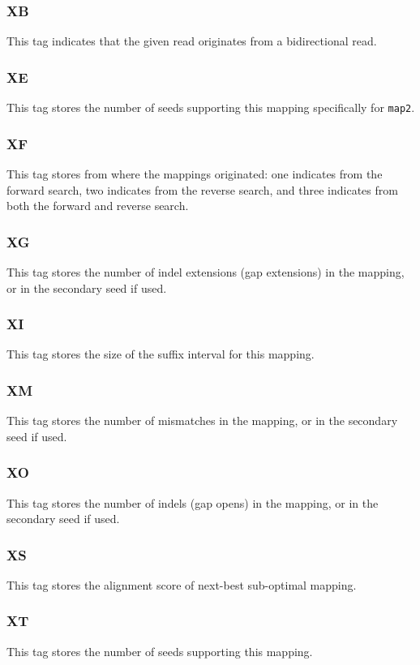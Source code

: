 \documentclass[a4paper,12pt]{book}
\newcommand{\TT}[1]{{\tt #1}} %
\begin{document}
\subsubsection{XB}
This tag indicates that the given read originates from a bidirectional read.

\subsubsection{XE}
This tag stores the number of seeds supporting this mapping specifically for \TT{map2}.

\subsubsection{XF}
This tag stores from where the mappings originated: one indicates from the forward search, two indicates from the reverse search, and three indicates from both the forward and reverse search.

\subsubsection{XG}
This tag stores the number of indel extensions (gap extensions) in the mapping, or in the secondary seed if used.

\subsubsection{XI}
This tag stores the size of the suffix interval for this mapping.

\subsubsection{XM}
This tag stores the number of mismatches in the mapping, or in the secondary seed if used.

\subsubsection{XO}
This tag stores the number of indels (gap opens) in the mapping, or in the secondary seed if used.

\subsubsection{XS}
This tag stores the alignment score of next-best sub-optimal mapping.

\subsubsection{XT}
This tag stores the number of seeds supporting this mapping.
\end{document}
